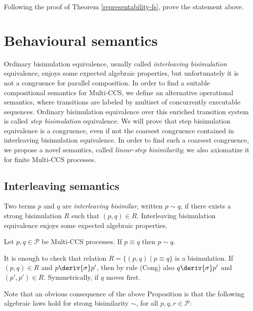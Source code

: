 \begin{exercise}
Following the proof of Theorem \ref{representability-fs}, prove the statement above.
\fine
\end{exercise}


\section{Behavioural semantics}

Ordinary bisimulation equivalence, usually called {\em interleaving bisimulation} equivalence, 
enjoys some expected algebraic properties, but unfortunately it
is not a congruence for parallel composition. In order to find a suitable compositional semantics for 
Multi-CCS,  we define an alternative operational
semantics, where transitions are labeled by multiset of concurrently executable sequences. Ordinary bisimulation
equivalence 
over this enriched transition system is called {\em step bisimulation} equivalence. 
We will prove that step bisimulation equivalence is a congruence, even if not the coarsest congruence 
contained in interleaving bisimulation equivalence. In order to find such a coarsest congruence,
we propose a novel semantics, called {\em linear-step bisimilarity}; we also axiomatize it for 
finite Multi-CCS processes.

\subsection{Interleaving semantics}

Two terms $p$ and $q$ are {\em interleaving bisimilar}, written
$p\sim q$, if there exists a strong bisimulation $R$ such that $(p,q)\in R$.
Interleaving bisimulation equivalence enjoys some expected algebraic properties. 


\begin{proposition}\label{prop1}
Let $p, q \in {\mathcal P}$ be Multi-CCS processes. If $p \equiv q$ then $p \sim q$.

\proof
It is enough to check that relation $R = \{(p, q) \mid p \equiv q\}$ is a bisimulation.
If $(p, q) \in R$ and $p \deriv{\sigma} p'$, then by rule (Cong)
also $q \deriv{\sigma} p'$ and $(p', p') \in R$. Symmetrically, if $q$ moves first.
\fine
\end{proposition}

Note that an obvious consequence of the above Proposition is that the following 
algebraic laws hold for strong bisimilarity $\sim$, for all $p, q, r \in {\mathcal P}$:\\

